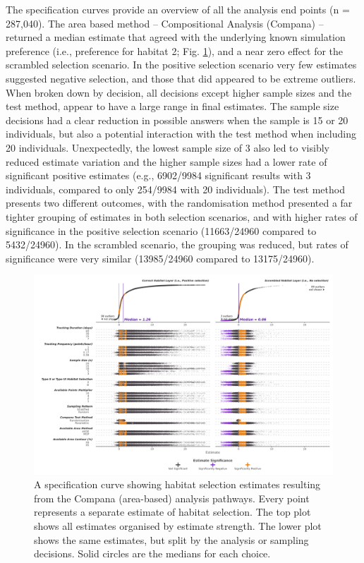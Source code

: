 \documentclass[10pt,a4paper]{article}
\begin{document}
The specification curves provide an overview of all the analysis end points (n = 287,040).
The area based method -- Compositional Analysis (Compana) -- returned a median estimate that agreed with the underlying known simulation preference (i.e., preference for habitat 2; Fig. \ref{fig:specCurveArea}), and a near zero effect for the scrambled selection scenario.
In the positive selection scenario very few estimates suggested negative selection, and those that did appeared to be extreme outliers.
When broken down by decision, all decisions except higher sample sizes and the test method, appear to have a large range in final estimates.
The sample size decisions had a clear reduction in possible answers when the sample is 15 or 20 individuals, but also a potential interaction with the test method when including 20 individuals.
Unexpectedly, the lowest sample size of 3 also led to visibly reduced estimate variation and the higher sample sizes had a lower rate of significant positive estimates (e.g., 6902/9984 significant results with 3 individuals, compared to only 254/9984 with 20 individuals).
The test method presents two different outcomes, with the randomisation method presented a far tighter grouping of estimates in both selection scenarios, and with higher rates of significance in the positive selection scenario (11663/24960 compared to 5432/24960).
In the scrambled scenario, the grouping was reduced, but rates of significance were very similar (13985/24960 compared to 13175/24960).

\begin{figure}
\includegraphics[width=1\linewidth]{../figures/area_specCurve} \caption{A specification curve showing habitat selection estimates resulting from the Compana (area-based) analysis pathways. Every point represents a separate estimate of habitat selection. The top plot shows all estimates organised by estimate strength. The lower plot shows the same estimates, but split by the analysis or sampling decisions. Solid circles are the medians for each choice.}\label{fig:specCurveArea}
\end{figure}
\end{document}
